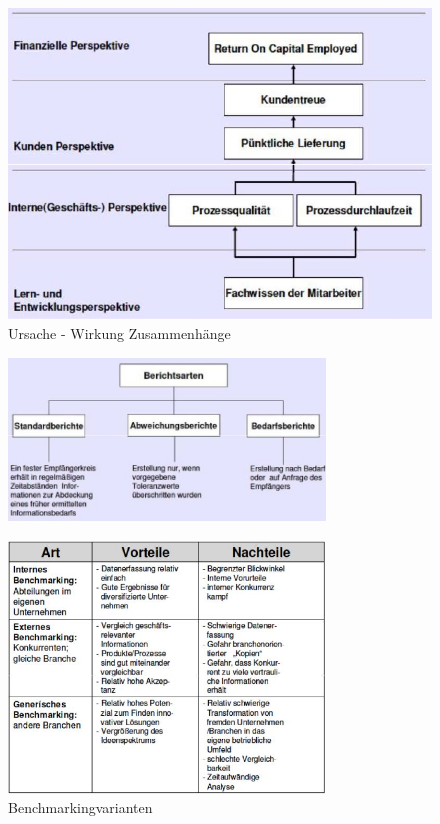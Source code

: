 \documentclass[ngerman,a4paper,12pt]{scrreprt}
\begin{document}
\begin{figure}[H]
	\centering
	\includegraphics[scale=0.5]{img/V7.10.jpg}
	\caption{Ursache - Wirkung Zusammenhänge}
	\label{}
\end{figure}

\begin{figure}[H]
	\centering
	\includegraphics[width=0.75\textwidth]{img/V7.11.jpg}
	\caption{}
	\label{}
\end{figure}

\begin{figure}[H]
	\centering
	\includegraphics[width=0.75\textwidth]{img/V7.12.jpg}
	\caption{Benchmarkingvarianten}
	\label{}
\end{figure}
\end{document}
